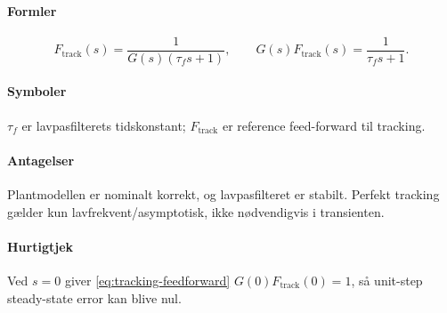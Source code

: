 \paragraph{Formler}
\begin{equation}
\label{eq:tracking-feedforward}
F_{\mathrm{track}}(s)=\frac{1}{G(s)(\tau_f s+1)},\qquad
G(s)F_{\mathrm{track}}(s)=\frac{1}{\tau_f s+1}.
\end{equation}

\paragraph{Symboler}
\(\tau_f\) er lavpasfilterets tidskonstant; \(F_{\mathrm{track}}\) er reference
feed-forward til tracking.

\paragraph{Antagelser}
Plantmodellen er nominalt korrekt, og lavpasfilteret er stabilt. Perfekt tracking gælder
kun lavfrekvent/asymptotisk, ikke nødvendigvis i transienten.

\paragraph{Hurtigtjek}
Ved \(s=0\) giver \eqref{eq:tracking-feedforward} \(G(0)F_{\mathrm{track}}(0)=1\), så
unit-step steady-state error kan blive nul.
